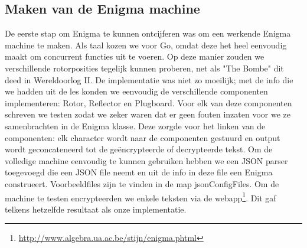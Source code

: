 \subsection{Maken van de Enigma machine}
De eerste stap om Enigma te kunnen ontcijferen was om een werkende Enigma machine te maken. Als taal kozen we voor Go, omdat deze het heel eenvoudig maakt om concurrent functies uit te voeren. Op deze manier zouden we verschillende rotorposities tegelijk kunnen proberen, net als "The Bombe" dit deed in Wereldoorlog II. De implementatie was niet zo moeilijk; met de info die we hadden uit de les konden we eenvoudig de verschillende componenten implementeren: Rotor, Reflector en Plugboard. Voor elk van deze componenten schreven we testen zodat we zeker waren dat er geen fouten inzaten voor we ze samenbrachten in de Enigma klasse. Deze zorgde voor het linken van de componenten: elk character wordt naar de componenten gestuurd en output wordt geconcateneerd tot de ge\"encrypteerde of decrypteerde tekst. Om de volledige machine eenvoudig te kunnen gebruiken hebben we een JSON parser toegevoegd die een JSON file neemt en uit de info in deze file een Enigma construeert. Voorbeeldfiles zijn te vinden in de map jsonConfigFiles. Om de machine te testen encrypteerden we enkele teksten via de webapp\footnote{\url{http://www.algebra.ua.ac.be/stijn/enigma.phtml}}. Dit gaf telkens hetzelfde resultaat als onze implementatie.

